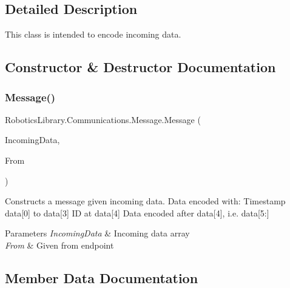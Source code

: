 \subsection{Detailed Description}
This class is intended to encode incoming data. 



\subsection{Constructor \& Destructor Documentation}
\mbox{\label{class_robotics_library_1_1_communications_1_1_message_a9e6e25188a64e3cc1c71282c2578cc4e}} 
\subsubsection{\texorpdfstring{Message()}{Message()}}
{\footnotesize\ttfamily Robotics\+Library.\+Communications.\+Message.\+Message (\begin{DoxyParamCaption}\item[{byte \mbox{[}$\,$\mbox{]}}]{Incoming\+Data,  }\item[{I\+P\+End\+Point}]{From }\end{DoxyParamCaption})}



Constructs a message given incoming data. Data encoded with\+: Timestamp data\mbox{[}0\mbox{]} to data\mbox{[}3\mbox{]} ID at data\mbox{[}4\mbox{]} Data encoded after data\mbox{[}4\mbox{]}, i.\+e. data\mbox{[}5\+:\mbox{]} 


\begin{DoxyParams}{Parameters}
{\em Incoming\+Data} & Incoming data array\\
\hline
{\em From} & Given from endpoint\\
\hline
\end{DoxyParams}


\subsection{Member Data Documentation}
\mbox{\label{class_robotics_library_1_1_communications_1_1_message_a69bb31eb51f778726ae40b2257e7e053}} 
